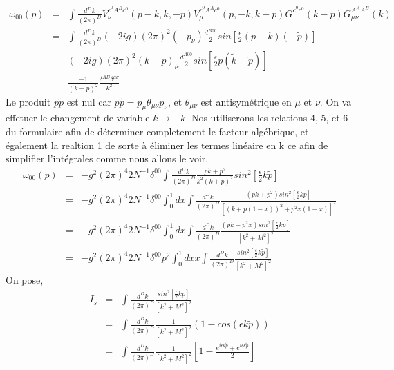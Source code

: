 \documentclass[a4paper,11pt]{article} %
\theoremstyle{plain}
\theoremstyle{definition}
\theoremstyle{remark}
\numberwithin{equation}{section}
\numberwithin{equation}{subsection}
\numberwithin{figure}{section}
\begin{document}
\begin{eqnarray*}
 \omega_{00}(p) &=&  \int  \frac{d^D k}{(2 \pi)^D}
V_{\nu}^{ \overline{c}^{0} A^{B} c^{0} } (p-k , k , -p )
V_{\mu}^{ \overline{c}^{0} A^{A} c^{0} } (p,-k,k-p )
G^{ \overline{c}^{0} c^{0} } (k-p)
G^{ A^{A} A^{B} }_{\mu \nu } (k)  \\
                              &=&  \int  \frac{d^D k}{(2 \pi)^D}
( -2ig) (2 \pi)^2  (-p_{\nu} )  \frac{d^{B00}}{2} sin \left[ \frac{\epsilon}{2}  (p-k) (- \tilde{p} ) \right]            \\
&&        ( -2ig) (2 \pi)^2 (k-p)_{\mu}   \frac{d^{A00}}{2} sin \left[ \frac{\epsilon}{2}  p ( \tilde{k} - \tilde{p} ) \right]              \\
&&         \frac{-1}{(k-p)^2}
\frac{\delta^{AB} \delta^{\mu \nu}}{k^2}
\end{eqnarray*}
Le produit $p \tilde{p} $ est nul car $p \tilde{p} = p_{\mu} \theta_{\mu \nu} p_{\nu} $, et $\theta_{\mu \nu}$ est antisymétrique en $\mu$ et $\nu$. On va effetuer le changement de variable $k \rightarrow -k$. Nos utiliserons les relations 4, 5, et 6 du formulaire afin de déterminer completement le facteur algébrique, et également la realtion 1 de sorte à éliminer les termes linéaire en k ce afin de simplifier l'intégrales comme nous allons le voir.
\begin{eqnarray*}
 \omega_{00}(p)  &=&  - g^2  (2 \pi)^4  2N^{-1}  \delta^{00}
\int  \frac{d^D k}{(2 \pi)^D}
\frac{pk + p^2}{k^2(k+p)^2}
sin^2 \left[ \frac{\epsilon}{2} k \tilde{p} \right]  \\
                              &=&  - g^2  (2 \pi)^4  2N^{-1}   \delta^{00}
\int_{0}^{1}  dx
\int  \frac{d^D k}{(2 \pi)^D}
\frac{(pk + p^2)  sin^2 \left[ \frac{\epsilon}{2} k \tilde{p} \right] }{\left[ (k+p(1-x))^2  +  p^2 x(1-x) \right]^2}  \\
                              &=&  - g^2  (2 \pi)^4  2N^{-1}    \delta^{00}
\int_{0}^{1}  dx
\int  \frac{d^D k}{(2 \pi)^D}
\frac{(pk + p^2 x)  sin^2 \left[ \frac{\epsilon}{2} k \tilde{p} \right] }{\left[ k^2  +  M^2 \right]^2}  \\
                              &=&  - g^2  (2 \pi)^4  2N^{-1}    \delta^{00} p^{2}
\int_{0}^{1}  dx x
\int  \frac{d^D k}{(2 \pi)^D}
\frac{sin^2 \left[ \frac{\epsilon}{2} k \tilde{p} \right] }{\left[ k^2  +  M^2 \right]^2}  
\end{eqnarray*}
On pose,
\begin{eqnarray*}
 I_{s} &=& \int  \frac{d^D k}{(2 \pi)^D}
\frac{sin^2 \left[ \frac{\epsilon}{2} k \tilde{p} \right] }{\left[ k^2  +  M^2  \right]^2}  \\
       &=&  \int  \frac{d^D k}{(2 \pi)^D}
\frac{1}{\left[ k^2  +  M^2 \right]^2} 
 \left( 1 - cos ( \epsilon k \tilde{p} ) \right) \\
                              &=&  \int  \frac{d^D k}{(2 \pi)^D}
\frac{1 }{\left[ k^2  +  M^2 \right]^2} 
 \left[ 1 - \frac{e^{ i \epsilon k \tilde{p} }   +   e^{i \epsilon k \tilde{p} } }{ 2 }  \right]
\end{eqnarray*}
\end{document}

